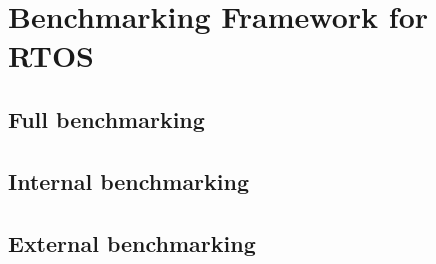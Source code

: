\part{Benchmarking Framework for RTOS}


\chapter{Full benchmarking}
\paragraph{}




\chapter{Internal benchmarking}
\paragraph{}





\chapter{External benchmarking}
\paragraph{}



